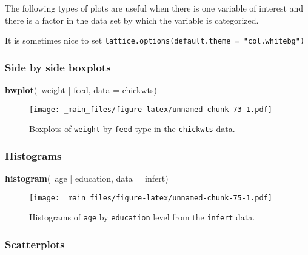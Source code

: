 \documentclass[]{book}
\newenvironment{Shaded}{\begin{snugshade}}{\end{snugshade}}
\newcommand{\KeywordTok}[1]{\textcolor[rgb]{0.13,0.29,0.53}{\textbf{{#1}}}}
\newcommand{\DataTypeTok}[1]{\textcolor[rgb]{0.13,0.29,0.53}{{#1}}}
\newcommand{\StringTok}[1]{\textcolor[rgb]{0.31,0.60,0.02}{{#1}}}
\newcommand{\NormalTok}[1]{{#1}}
\numberwithin{equation}{chapter}
\numberwithin{figure}{chapter}
\theoremstyle{plain}
\theoremstyle{definition}
\theoremstyle{remark}
\theoremstyle{definition}
\theoremstyle{definition}
\theoremstyle{remark}
\begin{document}
The following types of plots are useful when there is one variable of
interest and there is a factor in the data set by which the variable is
categorized.

It is sometimes nice to set
\texttt{lattice.options(default.theme\ =\ "col.whitebg")}

\subsubsection{Side by side boxplots}\label{side-by-side-boxplots}

\begin{Shaded}
\begin{Highlighting}[]
\KeywordTok{bwplot}\NormalTok{(~weight |}\StringTok{ }\NormalTok{feed, }\DataTypeTok{data =} \NormalTok{chickwts)}
\end{Highlighting}
\end{Shaded}

\begin{figure}[htbp]
\centering
\texttt{[image: \_main\_files/figure-latex/unnamed-chunk-73-1.pdf]}
\caption{\label{fig:unnamed-chunk-73}\small Boxplots of \texttt{weight} by \texttt{feed}
type in the \texttt{chickwts} data.}
\end{figure}




\subsubsection{Histograms}\label{histograms}

\begin{Shaded}
\begin{Highlighting}[]
\KeywordTok{histogram}\NormalTok{(~age |}\StringTok{ }\NormalTok{education, }\DataTypeTok{data =} \NormalTok{infert)}
\end{Highlighting}
\end{Shaded}

\begin{figure}[htbp]
\centering
\texttt{[image: \_main\_files/figure-latex/unnamed-chunk-75-1.pdf]}
\caption{\label{fig:unnamed-chunk-75}\small Histograms of \texttt{age} by \texttt{education}
level from the \texttt{infert} data.}
\end{figure}




\subsubsection{Scatterplots}\label{scatterplots}
\end{document}
